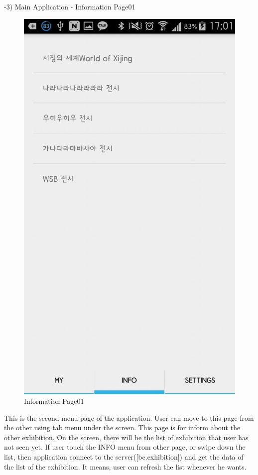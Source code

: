 \documentclass[conference]{IEEEtran}
\begin{document}
-3) Main Application - Information Page01
\begin{figure}[htbp]
\begin{center}
    \includegraphics[scale=0.2]{img_capture07}
    \caption{Information Page01} 
\end{center}
\end{figure}

This is the second menu page of the application. User can move to this page from the other using tab menu under the screen. This page is for inform about the other exhibition. On the screen, there will be the list of exhibition that user has not seen yet. If user touch the INFO menu from other page, or swipe down the list, then application connect to the server([bc.exhibition]) and get the data of the list of the exhibition. It means, user can refresh the list whenever he wants.\\\\\\\\\\\\\\\\
\end{document}
